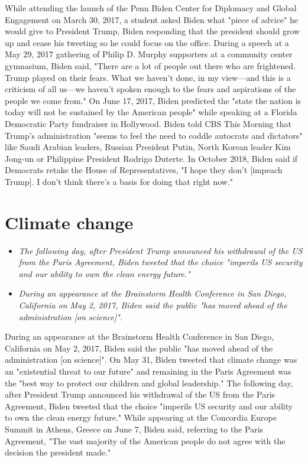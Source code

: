 While attending the launch of the Penn Biden Center for Diplomacy and
Global Engagement on March 30, 2017, a student asked Biden what "piece
of advice" he would give to President Trump, Biden responding that the
president should grow up and cease his tweeting so he could focus on the
office. During a speech at a May 29, 2017 gathering of Philip D. Murphy
supporters at a community center gymnasium, Biden said, "There are a lot
of people out there who are frightened. Trump played on their fears.
What we haven't done, in my view---and this is a criticism of all
us---we haven't spoken enough to the fears and aspirations of the people
we come from." On June 17, 2017, Biden predicted the "state the nation
is today will not be sustained by the American people" while speaking at
a Florida Democratic Party fundraiser in Hollywood. Biden told CBS This
Morning that Trump's administration "seems to feel the need to coddle
autocrats and dictators" like Saudi Arabian leaders, Russian President
Putin, North Korean leader Kim Jong-un or Philippine President Rodrigo
Duterte. In October 2018, Biden said if Democrats retake the House of
Representatives, "I hope they don't {[}impeach Trump{]}. I don't think
there's a basis for doing that right now."

\section{Climate change}\label{climate-change}

\begin{itemize}
\item
  \emph{The following day, after President Trump announced his
  withdrawal of the US from the Paris Agreement, Biden tweeted that the
  choice "imperils US security and our ability to own the clean energy
  future."}
\item
  \emph{During an appearance at the Brainstorm Health Conference in San
  Diego, California on May 2, 2017, Biden said the public "has moved
  ahead of the administration {[}on science{]}".}
\end{itemize}

During an appearance at the Brainstorm Health Conference in San Diego,
California on May 2, 2017, Biden said the public "has moved ahead of the
administration {[}on science{]}". On May 31, Biden tweeted that climate
change was an "existential threat to our future" and remaining in the
Paris Agreement was the "best way to protect our children and global
leadership." The following day, after President Trump announced his
withdrawal of the US from the Paris Agreement, Biden tweeted that the
choice "imperils US security and our ability to own the clean energy
future." While appearing at the Concordia Europe Summit in Athens,
Greece on June 7, Biden said, referring to the Paris Agreement, "The
vast majority of the American people do not agree with the decision the
president made."

